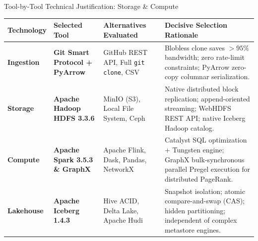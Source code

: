 \documentclass[aspectratio=169, 10pt]{beamer}
\begin{document}
\begin{frame}{Tool-by-Tool Technical Justification: Storage \& Compute}
  \begin{table}
    \centering
    \scriptsize
    \begin{tabularx}{\textwidth}{l p{3.2cm} p{3.5cm} X}
      \toprule
      \textbf{Technology} & \textbf{Selected Tool} & \textbf{Alternatives Evaluated} & \textbf{Decisive Selection Rationale} \\
      \midrule
      \textbf{Ingestion} & \textbf{Git Smart Protocol + PyArrow} & GitHub REST API, Full \texttt{git clone}, CSV & Blobless clone saves $>95\%$ bandwidth; zero rate-limit constraints; PyArrow zero-copy columnar serialization. \\
      \addlinespace
      \textbf{Storage} & \textbf{Apache Hadoop HDFS 3.3.6} & MinIO (S3), Local File System, Ceph & Native distributed block replication; append-oriented streaming; WebHDFS REST API; native Iceberg Hadoop catalog. \\
      \addlinespace
      \textbf{Compute} & \textbf{Apache Spark 3.5.3 \& GraphX} & Apache Flink, Dask, Pandas, NetworkX & Catalyst SQL optimization + Tungsten engine; GraphX bulk-synchronous parallel Pregel execution for distributed PageRank. \\
      \addlinespace
      \textbf{Lakehouse} & \textbf{Apache Iceberg 1.4.3} & Hive ACID, Delta Lake, Apache Hudi & Snapshot isolation; atomic compare-and-swap (CAS); hidden partitioning; independent of complex metastore engines. \\
      \bottomrule
    \end{tabularx}
  \end{table}
\end{frame}
\end{document}
